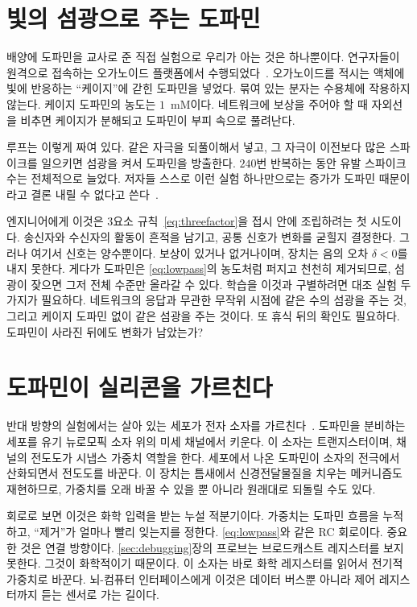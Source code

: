 \section{빛의 섬광으로 주는 도파민}
\label{sec:dishdopamine}

배양에 도파민을 교사로 준 직접 실험으로 우리가 아는 것은 하나뿐이다. 연구자들이 원격으로 접속하는 오가노이드 플랫폼에서 수행되었다~\cite{Jordan2024}. 오가노이드를 적시는 액체에 빛에 반응하는 “케이지”에 갇힌 도파민을 넣었다. 묶여 있는 분자는 수용체에 작용하지 않는다. 케이지 도파민의 농도는 $1$~mM이다. 네트워크에 보상을 주어야 할 때 자외선을 비추면 케이지가 분해되고 도파민이 부피 속으로 풀려난다.

루프는 이렇게 짜여 있다. 같은 자극을 되풀이해서 넣고, 그 자극이 이전보다 많은 스파이크를 일으키면 섬광을 켜서 도파민을 방출한다. $240$번 반복하는 동안 유발 스파이크 수는 전체적으로 늘었다. 저자들 스스로 이런 실험 하나만으로는 증가가 도파민 때문이라고 결론 내릴 수 없다고 쓴다~\cite{Jordan2024}.

엔지니어에게 이것은 3요소 규칙~\eqref{eq:threefactor}을 접시 안에 조립하려는 첫 시도이다. 송신자와 수신자의 활동이 흔적을 남기고, 공통 신호가 변화를 굳힐지 결정한다. 그러나 여기서 신호는 양수뿐이다. 보상이 있거나 없거나이며, 장치는 음의 오차 $\delta<0$를 내지 못한다. 게다가 도파민은 \eqref{eq:lowpass}의 농도처럼 퍼지고 천천히 제거되므로, 섬광이 잦으면 그저 전체 수준만 올라갈 수 있다. 학습을 이것과 구별하려면 대조 실험 두 가지가 필요하다. 네트워크의 응답과 무관한 무작위 시점에 같은 수의 섬광을 주는 것, 그리고 케이지 도파민 없이 같은 섬광을 주는 것이다. 또 휴식 뒤의 확인도 필요하다. 도파민이 사라진 뒤에도 변화가 남았는가?

\section{도파민이 실리콘을 가르친다}
\label{sec:biohybrid}

반대 방향의 실험에서는 살아 있는 세포가 전자 소자를 가르친다~\cite{Keene2020}. 도파민을 분비하는 세포를 유기 뉴로모픽 소자 위의 미세 채널에서 키운다. 이 소자는 트랜지스터이며, 채널의 전도도가 시냅스 가중치 역할을 한다. 세포에서 나온 도파민이 소자의 전극에서 산화되면서 전도도를 바꾼다. 이 장치는 틈새에서 신경전달물질을 치우는 메커니즘도 재현하므로, 가중치를 오래 바꿀 수 있을 뿐 아니라 원래대로 되돌릴 수도 있다.

회로로 보면 이것은 화학 입력을 받는 누설 적분기이다. 가중치는 도파민 흐름을 누적하고, “제거”가 얼마나 빨리 잊는지를 정한다. \eqref{eq:lowpass}와 같은 RC 회로이다. 중요한 것은 연결 방향이다. \ref{sec:debugging}장의 프로브는 브로드캐스트 레지스터를 보지 못한다. 그것이 화학적이기 때문이다. 이 소자는 바로 화학 레지스터를 읽어서 전기적 가중치로 바꾼다. 뇌-컴퓨터 인터페이스에게 이것은 데이터 버스뿐 아니라 제어 레지스터까지 듣는 센서로 가는 길이다.

